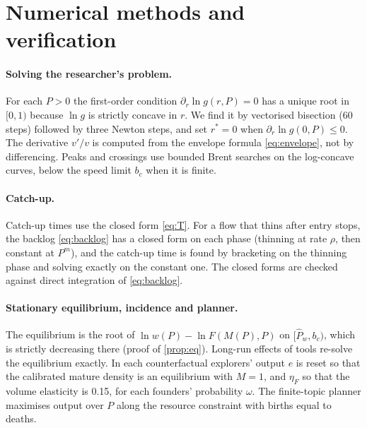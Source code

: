 \section{Numerical methods and verification}\label{app:numerics}

\paragraph{Solving the researcher's problem.} For each $P>0$ the first-order
condition $\partial_r\ln g(r,P)=0$ has a unique root in $[0,1)$ because $\ln g$ is
strictly concave in $r$. We find it by vectorised bisection (60 steps)
followed by three Newton steps, and set $r^*=0$ when $\partial_r\ln g(0,P)\le0$.
The derivative $v'/v$ is computed from the envelope formula
\eqref{eq:envelope}, not by differencing. Peaks and crossings use bounded
Brent searches on the log-concave curves, below the speed limit $b_c$ when it
is finite.

\paragraph{Catch-up.} Catch-up times use the closed form \eqref{eq:T}. For a
flow that thins after entry stops, the backlog \eqref{eq:backlog} has a closed
form on each phase (thinning at rate $\rho$, then constant at $P^m$), and the
catch-up time is found by bracketing on the thinning phase and solving
exactly on the constant one. The closed forms are checked against direct
integration of \eqref{eq:backlog}.

\paragraph{Stationary equilibrium, incidence and planner.} The equilibrium is
the root of $\ln w(P)-\ln F(M(P),P)$ on $[\hat P_w,b_c)$, which is strictly
decreasing there (proof of \cref{prop:eq}). Long-run effects of tools re-solve
the equilibrium exactly. In each counterfactual explorers' output $e$ is
reset so that the calibrated mature density is an equilibrium with $M=1$, and
$\eta_F$ so that the volume elasticity is 0.15, for each founders' probability
$\omega$. The finite-topic planner maximises output over $P$ along the resource
constraint with births equal to deaths.

